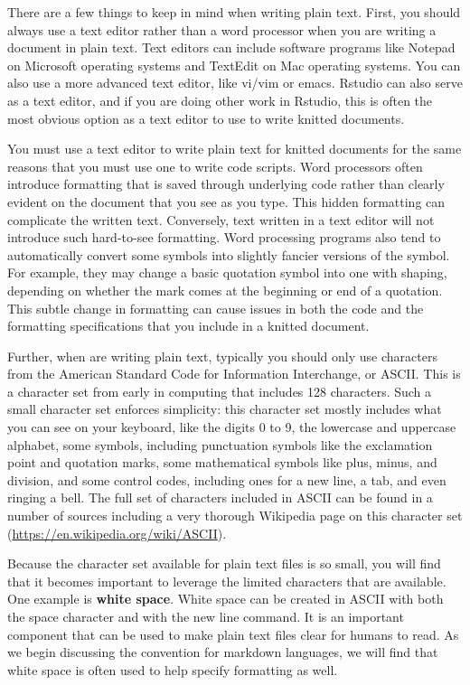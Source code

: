 \documentclass[]{tufte-book}
\begin{document}
There are a few things to keep in mind when writing plain text. First, you
should always use a text editor rather than a word processor when you are
writing a document in plain text. Text editors can include software programs
like Notepad on Microsoft operating systems and TextEdit on Mac operating
systems. You can also use a more advanced text editor, like vi/vim or emacs.
Rstudio can also serve as a text editor, and if you are doing other work in
Rstudio, this is often the most obvious option as a text editor to use to write
knitted documents.

You must use a text editor to write plain text for knitted documents for the
same reasons that you must use one to write code scripts. Word processors often
introduce formatting that is saved through underlying code rather than clearly
evident on the document that you see as you type. This hidden formatting can
complicate the written text. Conversely, text written in a text editor will not
introduce such hard-to-see formatting. Word processing programs also tend to
automatically convert some symbols into slightly fancier versions of the symbol.
For example, they may change a basic quotation symbol into one with shaping,
depending on whether the mark comes at the beginning or end of a quotation. This
subtle change in formatting can cause issues in both the code and the formatting
specifications that you include in a knitted document.

Further, when are writing plain text, typically you should only use characters
from the American Standard Code for Information Interchange, or ASCII. This is a
character set from early in computing that includes 128 characters. Such a small
character set enforces simplicity: this character set mostly includes what you
can see on your keyboard, like the digits 0 to 9, the lowercase and uppercase
alphabet, some symbols, including punctuation symbols like the exclamation point
and quotation marks, some mathematical symbols like plus, minus, and division,
and some control codes, including ones for a new line, a tab, and even ringing a
bell. The full set of characters included in ASCII can be found in a number of
sources including a very thorough Wikipedia page on this character set (\url{https://en.wikipedia.org/wiki/ASCII}).

Because the character set available for plain text files is so small, you will
find that it becomes important to leverage the limited characters that are
available. One example is \textbf{white space}. White space can be created in ASCII
with both the space character and with the new line command. It is an important
component that can be used to make plain text files clear for humans to read. As
we begin discussing the convention for markdown languages, we will find that
white space is often used to help specify formatting as well.
\end{document}
